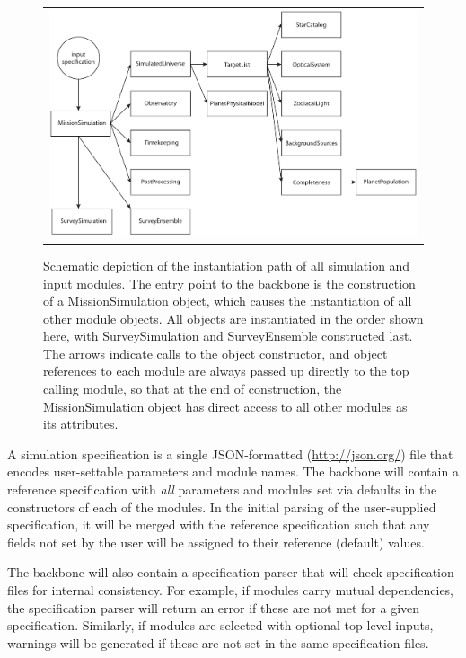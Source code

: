 \documentclass[cleanfoot]{asme2ej}
\begin{document}
\begin{figure}[ht]
    \begin{center}
        \begin{tabular}{c}
             \includegraphics[width=1\textwidth]{instantiation_tree}
        \end{tabular}
    \end{center}
    \caption{Schematic depiction of the instantiation path of all simulation and input modules.  The entry point to the backbone is the construction of a MissionSimulation object, which causes the instantiation of all other module objects.  All objects are instantiated in the order shown here, with SurveySimulation and SurveyEnsemble constructed last.  The arrows indicate calls to the object constructor, and object references to each module are always passed up directly to the top calling module, so that at the end of construction, the MissionSimulation object has direct access to all other modules as its attributes.}
    \label{fig:instantiation_tree}
\end{figure}

A simulation specification is a single JSON-formatted (\url{http://json.org/}) file that encodes user-settable parameters and module names.  The backbone will contain a reference specification with \emph{all} parameters and modules set via defaults in the constructors of each of the modules.  In the initial parsing of the user-supplied specification, it will be merged with the reference specification such that any fields not set by the user will be assigned to their reference (default) values.   

The backbone will also contain a specification parser that will check specification files for internal consistency.  For example, if modules carry mutual dependencies, the specification parser will return an error if these are not met for a given specification.  Similarly, if modules are selected with optional top level inputs, warnings will be generated if these are not set in the same specification files.
\end{document}
